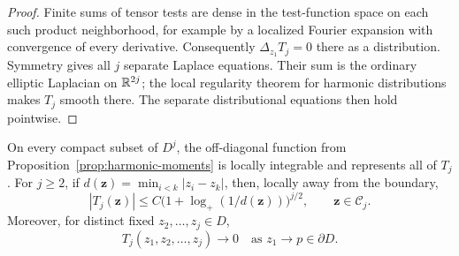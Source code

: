 \begin{proof}
Finite sums of tensor tests are dense in the test-function space
on each such product neighborhood, for example by a localized
Fourier expansion with convergence of every derivative.
Consequently \(\Delta_{z_1}T_j=0\) there as a distribution.
Symmetry gives all \(j\) separate Laplace equations.  Their sum is
the ordinary elliptic Laplacian on \(\mathbb R^{2j}\); the local regularity
theorem for harmonic distributions makes \(T_j\) smooth there.
The separate distributional equations then hold pointwise.
\end{proof}

\begin{lemma}
\label{lem:no-diagonal}
On every compact subset of \(D^j\), the off-diagonal function from
Proposition~\ref{prop:harmonic-moments} is locally integrable and
represents all of \(T_j\).  For \(j\ge2\), if
\(d(\mathbf z)=\min_{i<k}|z_i-z_k|\), then, locally away from
the boundary,
\begin{equation}
 |T_j(\mathbf z)|
 \le C\bigl(1+\log_+(1/d(\mathbf z))\bigr)^{j/2},
 \qquad \mathbf z\in\mathcal C_j.
 \label{eq:limit-log-bound}
\end{equation}
Moreover, for distinct fixed \(z_2,\ldots,z_j\in D\),
\begin{equation}
 T_j(z_1,z_2,\ldots,z_j)\longrightarrow0
        \quad\text{as }z_1\longrightarrow p\in\partial D.
 \label{eq:limit-zero-boundary}
\end{equation}
\end{lemma}

